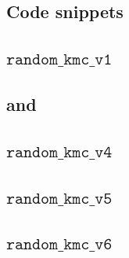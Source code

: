 \documentclass[b5paper]{report}
\begin{document}
\begin{appendices}
\chapter{Code snippets}

\section{\texorpdfstring{$\texttt{random\_kmc\_v1}$}{random\_kmc\_v1}}
\label{apx:randkmcv1}

\section{\texorpdfstring{ and }{random\_kmc\_v2 and random\_kmc\_v3}}
\label{apx:randkmcv2}

\section{\texorpdfstring{$\texttt{random\_kmc\_v4}$}{random\_kmc\_v4}}
\label{apx:randkmcv4}

\section{\texorpdfstring{$\texttt{random\_kmc\_v5}$}{random\_kmc\_v5}}
\label{apx:randkmcv5}

\section{\texorpdfstring{$\texttt{random\_kmc\_v6}$}{random\_kmc\_v6}}
\label{apx:randkmcv6}


\end{appendices}
\end{document}
